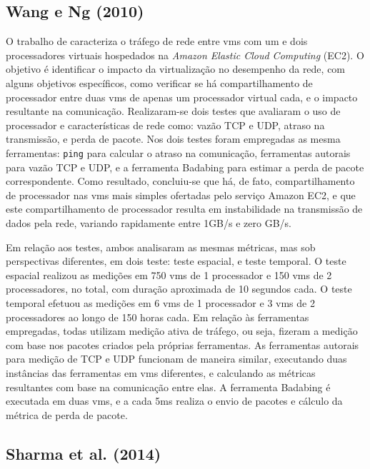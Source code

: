\subsection{Wang e Ng (2010)}

O trabalho de  caracteriza o tráfego de rede entre \acp{vm} com um e dois processadores virtuais hospedados na \textit{Amazon Elastic Cloud Computing} (EC2).
%
O objetivo é identificar o impacto da virtualização no desempenho da rede, com alguns objetivos específicos, como verificar se há compartilhamento de processador entre duas \acp{vm} de apenas um processador virtual cada, e o impacto resultante na comunicação.
%
Realizaram-se dois testes que avaliaram o uso de processador e características de rede como: vazão TCP e UDP, atraso na transmissão, e perda de pacote.
%
Nos dois testes foram empregadas as mesma ferramentas: \texttt{ping} para calcular o atraso na comunicação, ferramentas autorais para vazão TCP e UDP, e a ferramenta Badabing \cite{sommers:2005:badabing} para estimar a perda de pacote correspondente.
% 
Como resultado, concluiu-se que há, de fato, compartilhamento de processador nas \acp{vm} mais simples ofertadas pelo serviço Amazon EC2, e que este compartilhamento de processador resulta em instabilidade na transmissão de dados pela rede, variando rapidamente entre 1GB/s e zero GB/s.

Em relação aos testes, ambos analisaram as mesmas métricas, mas sob perspectivas diferentes, em dois teste: teste espacial, e teste temporal.
%
O teste espacial realizou as medições em 750 \acp{vm} de 1 processador e 150 \acp{vm} de 2 processadores, no total, com duração aproximada de 10 segundos cada.
%
O teste temporal efetuou as medições em 6 \acp{vm} de 1 processador e 3 \acp{vm} de 2 processadores ao longo de 150 horas cada.
%
Em relação às ferramentas empregadas, todas utilizam medição ativa de tráfego, ou seja, fizeram a medição com base nos pacotes criados pela próprias ferramentas.
%
As ferramentas autorais para medição de TCP e UDP funcionam de maneira similar, executando duas instâncias das ferramentas em \acp{vm} diferentes, e calculando as métricas resultantes com base na comunicação entre elas.
%
A ferramenta Badabing é executada em duas \acp{vm}, e a cada 5ms realiza o envio de pacotes e cálculo da métrica de perda de pacote.


\subsection{Sharma et al. (2014)}

